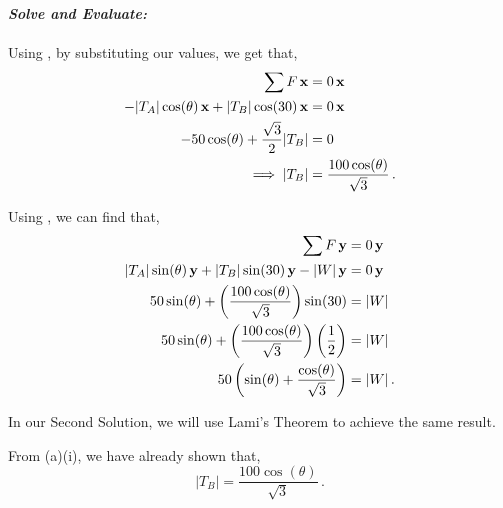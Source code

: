 \begin{subquestions}
\begin{subsubquestions}
\textbf{\textit{Solve and Evaluate:}} \\ \\
Using , by substituting our values, we get that,
\begin{align}
	\sum F \,\mathbf{x} & = 0 \,\mathbf{x} \nonumber \\
	-|T_A|\cos(\theta)\,\mathbf{x} +  |T_B|\cos(30)\,\mathbf{x} & = 0 \,\mathbf{x} \nonumber \\
	-50\cos(\theta) + \frac{\sqrt{3}}{2}|T_B| & = 0 \nonumber \\
	\implies |T_B| & = \frac{100\cos(\theta)}{\sqrt{3}} \,.
\end{align}

Using , we can find that,
\begin{align}
	\sum F \,\mathbf{y} & = 0 \,\mathbf{y} \nonumber \\
	|T_A|\sin(\theta)\,\mathbf{y} + |T_B|\sin(30)\,\mathbf{y} -|W|\,\mathbf{y} & = 0 \,\mathbf{y} \nonumber \\
	50\sin(\theta) + \left(\frac{100\cos(\theta)}{\sqrt{3}}\right)\sin(30) & = |W| \nonumber \\
	50\sin(\theta) + \left(\frac{100\cos(\theta)}{\sqrt{3}}\right)\left(\frac{1}{2}\right) & = |W|\nonumber \\
	50 \left(\sin(\theta) + \frac{\cos(\theta)}{\sqrt{3}}\right) & = |W| \,.
\end{align}

In our Second Solution, we will use Lami's Theorem to achieve the same result.


\subsubquestion
From (a)(i), we have already shown that,
\begin{equation}
	|T_B| = \frac{100\cos(\theta)}{\sqrt{3}} \,.
\end{equation}

\end{subsubquestions}


\subquestion

\begin{subsubquestions}
	
\subsubquestion 


\end{subsubquestions}
\end{subquestions}

